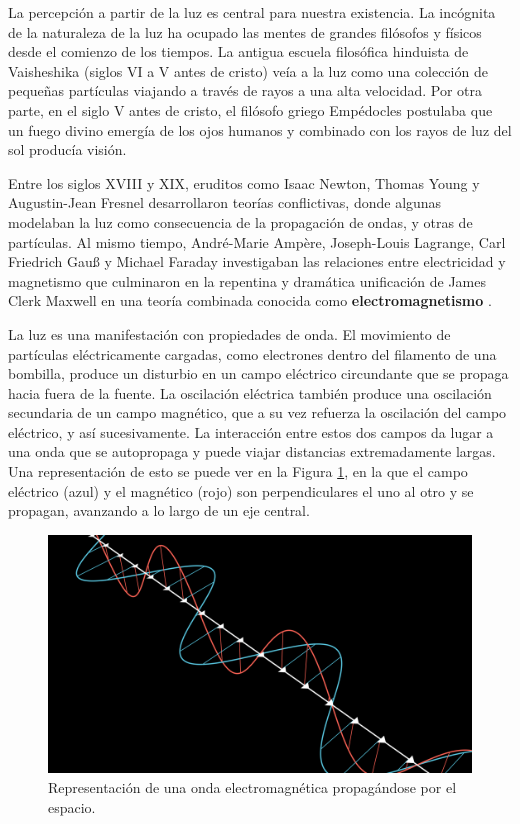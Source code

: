 La percepción a partir de la luz es central para nuestra existencia.
La incógnita de la naturaleza de la luz ha ocupado las mentes de grandes filósofos y físicos desde el comienzo de los tiempos.
La antigua escuela filosófica hinduista de Vaisheshika (siglos VI a V antes de cristo) veía a la luz como una colección de pequeñas partículas viajando a través de rayos a una alta velocidad.
Por otra parte, en el siglo V antes de cristo, el filósofo griego Empédocles postulaba que un fuego divino emergía de los ojos humanos y combinado con los rayos de luz del sol producía visión.

Entre los siglos XVIII y XIX, eruditos como Isaac Newton, Thomas Young y Augustin-Jean Fresnel desarrollaron teorías conflictivas, donde algunas modelaban la luz como consecuencia de la propagación de ondas, y otras de partículas.
Al mismo tiempo, André-Marie Ampère, Joseph-Louis Lagrange, Carl Friedrich Gauß y Michael Faraday investigaban las relaciones entre electricidad y magnetismo que culminaron en la repentina y dramática unificación de James Clerk Maxwell en una teoría combinada conocida como \textbf{electromagnetismo} \cite{maxwell-equations}.

La luz es una manifestación con propiedades de onda.
El movimiento de partículas eléctricamente cargadas, como electrones dentro del filamento de una bombilla, produce un disturbio en un campo eléctrico circundante que se propaga hacia fuera de la fuente.
La oscilación eléctrica también produce una oscilación secundaria de un campo magnético, que a su vez refuerza la oscilación del campo eléctrico, y así sucesivamente.
La interacción entre estos dos campos da lugar a una onda que se autopropaga y puede viajar distancias extremadamente largas.
Una representación de esto se puede ver en la Figura \ref{fig:electromagnetic-wave}, en la que el campo eléctrico (azul) y el magnético (rojo) son perpendiculares el uno al otro y se propagan, avanzando a lo largo de un eje central.

\begin{figure}[t]
    \centering
    \includegraphics[width=\textwidth]{electromagnetic_wave.png}
    \caption{Representación de una onda electromagnética propagándose por el espacio.}
    \label{fig:electromagnetic-wave}
\end{figure}

